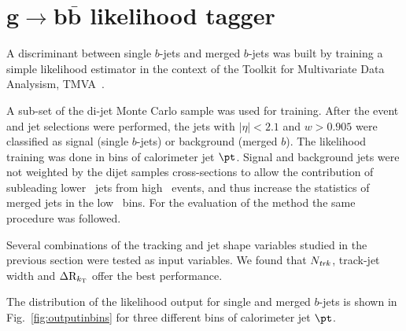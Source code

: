 \section{$\bm{ g\rightarrow b\bar{b}}$ likelihood tagger}\label{sec:likelihood_tagger}
 
A discriminant between single $b$-jets and merged $b$-jets was built by training a simple likelihood estimator in the context of the Toolkit for Multivariate Data Analysism, TMVA~\cite{Hocker:2007ht}.

A sub-set of the di-jet Monte Carlo sample was used for training. After the event and jet selections were performed, the jets with $|\eta| < 2.1$ and $w > 0.905$ were classified as signal (single $b$-jets) or background (merged $b$). %
The likelihood training was done in bins of calorimeter jet $\pt$. %
Signal and background jets were not weighted by the dijet samples cross-sections to allow the contribution of subleading lower \pt\ jets from high \pt\ events, and thus increase the statistics of merged jets in the low \pt\ bins. For the evaluation of the method the same procedure was followed.

Several combinations of the tracking and jet shape variables studied in the previous section were tested as input variables. We found that $N_{\it trk}$, track-jet width and $\Delta {\rm R}_{k_{\rm T}}$ offer the best performance.

The distribution of the likelihood output for single and merged $b$-jets is shown in  Fig.~\ref{fig:outputinbins} for three different bins of calorimeter jet $\pt$.

